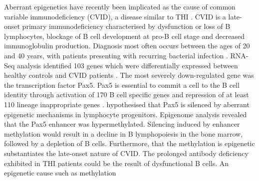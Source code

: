 \documentclass[12pt]{article}
\begin{document}
			Aberrant epigenetics have recently been implicated as the cause of common variable immunodeficiency (CVID), a disease similar to THI \citep{Tallmadge15}.
			CVID is a late-onset primary immunodeficiency characterised by dysfunction or loss of B lymphocytes, blockage of B cell development at pro-B cell stage and decreased immunoglobulin production. 
			Diagnosis most often occurs between the ages of 20 and 40 years, with patients presenting with recurring bacterial infection \citep{Cunningham-Rundles12}.
			RNA-Seq analysis identified 103 genes which were differentially expressed between healthy controls and CVID patients \citep{Tallmadge15}.
			The most severely down-regulated gene was the transcription factor Pax5.
			Pax5 is essential to commit a cell to the B cell identity through activation of 170 B cell specific genes and repression of at least 110 lineage inappropriate genes \citep{Schebesta07,Delogu06,Roessler07}.
			\citet{Tallmadge15} hypothesised that Pax5 is silenced by aberrant epigenetic mechanisms in lymphocyte progenitors. 
			Epigenome analysis revealed that the Pax5 enhancer was hypermethylated.
			Silencing induced by enhancer methylation would result in a decline in B lymphopoiesis in the bone marrow, followed by a depletion of B cells.
			Furthermore, that the methylation is epigenetic substantiates the late-onset nature of CVID. 
			The prolonged antibody deficiency exhibited in THI patients could be the result of dysfunctional B cells. 
			An epigenetic cause such as methylation 
	
\end{document}
